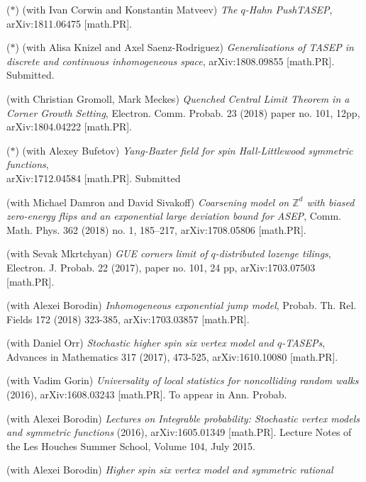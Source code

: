 \documentclass[letterpaper,11pt]{article}
\begin{document}
\begin{etaremune}
	\renewcommand{\labelenumi}{[\theenumi]}
\item ($*$)
	(with Ivan Corwin and Konstantin Matveev)
	\emph{The $q$-Hahn PushTASEP},
	arXiv:1811.06475 [math.PR].
\item ($*$)
	(with Alisa Knizel and
		Axel Saenz-Rodriguez)
		\emph{Generalizations of TASEP in discrete and continuous inhomogeneous space},
		arXiv:1808.09855 [math.PR].
		Submitted.
\item (with Christian Gromoll, Mark Meckes)
		\emph{Quenched Central Limit Theorem in a Corner Growth Setting},
		Electron. Comm. Probab. 23 (2018) paper no. 101, 12pp,
		arXiv:1804.04222 [math.PR].
		
	
	\item ($*$)  (with Alexey Bufetov)
		\emph{Yang-Baxter field for spin Hall-Littlewood symmetric functions},\\
		arXiv:1712.04584 [math.PR]. Submitted
\item
	      (with Michael Damron and David Sivakoff) \emph{Coarsening model
		      on $\mathbb{Z}^d$ with biased zero-energy flips and an exponential large
			deviation bound for ASEP}, 
			Comm. Math. Phys. 362 (2018) no. 1, 185–217,
			arXiv:1708.05806 [math.PR].	
\item
	      (with Sevak Mkrtchyan)
	      \emph{GUE corners limit of $q$-distributed lozenge tilings},
				Electron. J. Probab. 22 (2017), paper no. 101, 24 pp,
				arXiv:1703.07503 [math.PR].
	\item
	      (with Alexei Borodin)
	      \emph{Inhomogeneous exponential jump model},
				Probab. Th. Rel. Fields
				172 (2018) 323-385,
				arXiv:1703.03857 [math.PR].
	\item
	      (with Daniel Orr)
	      \emph{Stochastic higher spin six vertex model and $q$-TASEPs},
	      Advances in Mathematics 317 (2017), 473-525, arXiv:1610.10080
	      [math.PR].
	\item  
	      (with Vadim Gorin)
	      \emph{Universality of local statistics for noncolliding random
		      walks}
	      (2016),
				arXiv:1608.03243 [math.PR]. To appear in Ann. Probab.
	\item
	      (with Alexei Borodin)
	      \emph{Lectures on Integrable probability: Stochastic vertex
		      models and symmetric functions}
	      (2016), arXiv:1605.01349 [math.PR]. Lecture Notes of the Les
	      Houches Summer School, Volume 104, July 2015.
	\item
	      (with Alexei Borodin)
	      \emph{Higher spin six vertex model and symmetric rational
}
\end{etaremune}
\end{document}

